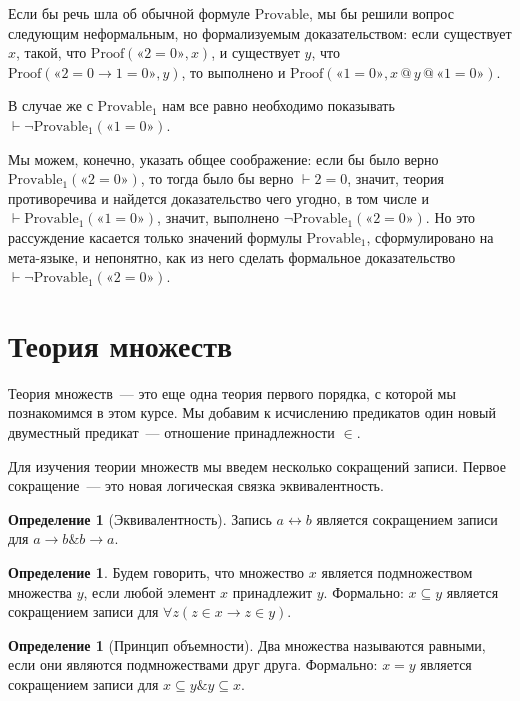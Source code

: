 \documentclass[a4paper,11pt]{article}
\theoremstyle{definition}
\newtheorem{dfn}[thm]{Определение}
\newcommand{\proves}{\vdash}
\newcommand{\amp}{\mathbin{\&}}
\newcommand{\gn}[1]{\text{«}#1\text{»}}
\begin{document}
Если бы речь шла об обычной формуле $\mathrm{Provable}$, мы бы решили вопрос
следующим неформальным, но формализуемым доказательством: если существует $x$,
такой, что $\mathrm{Proof}(\gn{2 = 0}, x)$, и существует $y$, что
$\mathrm{Proof}(\gn{2 = 0 \to 1 = 0}, y)$, то выполнено и $\mathrm{Proof}(\gn{1 =
0}, x \mathbin{@} y \mathbin{@} \gn{1 = 0})$.

В случае же с $\mathrm{Provable}_1$ нам все равно необходимо показывать $\proves
\neg\mathrm{Provable}_1(\gn{1 = 0})$.

Мы можем, конечно, указать общее соображение: если бы было верно
$\mathrm{Provable}_1(\gn{2 = 0})$, то тогда было бы верно $\proves 2 = 0$,
значит, теория противоречива и найдется доказательство чего угодно, в том числе
и $\proves \mathrm{Provable}_1(\gn{1 = 0})$, значит, выполнено
$\neg\mathrm{Provable}_1(\gn{2 = 0})$. Но это рассуждение касается только
значений формулы $\mathrm{Provable}_1$, сформулировано на мета-языке, и
непонятно, как из него сделать формальное доказательство $\proves
\neg\mathrm{Provable}_1(\gn{2 = 0})$.

\section{Теория множеств}
Теория множеств~--- это еще одна теория первого порядка, с которой мы
познакомимся в этом курсе. Мы добавим к исчислению предикатов один новый
двуместный предикат~--- отношение принадлежности $\in$.

Для изучения теории множеств мы введем несколько сокращений записи. Первое
сокращение~--- это новая логическая связка эквивалентность.

\begin{dfn}[Эквивалентность]
Запись $a \leftrightarrow b$ является сокращением записи для $a \to b \amp b \to
a$.
\end{dfn}

\begin{dfn}
Будем говорить, что множество $x$ является подмножеством множества $y$, если
любой элемент $x$ принадлежит $y$. Формально: $x \subseteq y$ является
сокращением записи для $\forall z(z \in x \to z \in y)$.
\end{dfn}

\begin{dfn}[Принцип объемности]
Два множества называются равными, если они являются подмножествами друг друга.
Формально: $x = y$ является сокращением записи для $x \subseteq y \amp y
\subseteq x$.
\end{dfn}
\end{document}
